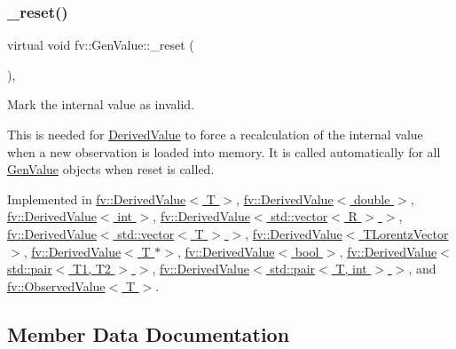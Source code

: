 \subsubsection{\texorpdfstring{\+\_\+reset()}{\_reset()}}
{\footnotesize\ttfamily virtual void fv\+::\+Gen\+Value\+::\+\_\+reset (\begin{DoxyParamCaption}{ }\end{DoxyParamCaption})\hspace{0.3cm}{\ttfamily [protected]}, {}}



Mark the internal value as invalid. 

This is needed for \hyperlink{classfv_1_1DerivedValue}{Derived\+Value} to force a recalculation of the internal value when a new observation is loaded into memory. It is called automatically for all \hyperlink{classfv_1_1GenValue}{Gen\+Value} objects when reset is called. 

Implemented in \hyperlink{classfv_1_1DerivedValue_a5c296d4f3171797f31a3fab002dececa}{fv\+::\+Derived\+Value$<$ T $>$}, \hyperlink{classfv_1_1DerivedValue_a5c296d4f3171797f31a3fab002dececa}{fv\+::\+Derived\+Value$<$ double $>$}, \hyperlink{classfv_1_1DerivedValue_a5c296d4f3171797f31a3fab002dececa}{fv\+::\+Derived\+Value$<$ int $>$}, \hyperlink{classfv_1_1DerivedValue_a5c296d4f3171797f31a3fab002dececa}{fv\+::\+Derived\+Value$<$ std\+::vector$<$ R $>$ $>$}, \hyperlink{classfv_1_1DerivedValue_a5c296d4f3171797f31a3fab002dececa}{fv\+::\+Derived\+Value$<$ std\+::vector$<$ T $>$ $>$}, \hyperlink{classfv_1_1DerivedValue_a5c296d4f3171797f31a3fab002dececa}{fv\+::\+Derived\+Value$<$ T\+Lorentz\+Vector $>$}, \hyperlink{classfv_1_1DerivedValue_a5c296d4f3171797f31a3fab002dececa}{fv\+::\+Derived\+Value$<$ T $\ast$$>$}, \hyperlink{classfv_1_1DerivedValue_a5c296d4f3171797f31a3fab002dececa}{fv\+::\+Derived\+Value$<$ bool $>$}, \hyperlink{classfv_1_1DerivedValue_a5c296d4f3171797f31a3fab002dececa}{fv\+::\+Derived\+Value$<$ std\+::pair$<$ T1, T2 $>$ $>$}, \hyperlink{classfv_1_1DerivedValue_a5c296d4f3171797f31a3fab002dececa}{fv\+::\+Derived\+Value$<$ std\+::pair$<$ T, int $>$ $>$}, and \hyperlink{classfv_1_1ObservedValue_af301f95c27cfa8024105a845ac6a7760}{fv\+::\+Observed\+Value$<$ T $>$}.



\subsection{Member Data Documentation}
\hypertarget{classfv_1_1GenValue_ab58b81925a05884bbebca0d870da80d0}{}\label{classfv_1_1GenValue_ab58b81925a05884bbebca0d870da80d0} 
